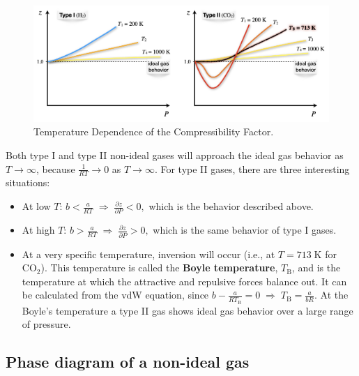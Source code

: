 \documentclass[
  9pt,
]{extbook}
\providecommand{\tightlist}{%
  \setlength{\itemsep}{0pt}\setlength{\parskip}{0pt}}
\theoremstyle{definition}
\theoremstyle{definition}
\theoremstyle{definition}
\theoremstyle{remark}
\begin{document}
\begin{figure}

{\centering \includegraphics[width=0.9\linewidth]{./img/OEP_Figures.013} 

}

\caption{Temperature Dependence of the Compressibility Factor.}\label{fig:Fig1Zb2}
\end{figure}

Both type I and type II non-ideal gases will approach the ideal gas behavior as \(T\rightarrow \infty\), because \(\frac{1}{RT}\rightarrow 0\) as \(T\rightarrow \infty\). For type II gases, there are three interesting situations:

\begin{itemize}
\tightlist
\item
  At low \(T\): \(b<\frac{a}{RT} \; \Rightarrow \; \frac{\partial z}{\partial P} < 0,\) which is the behavior described above.
\item
  At high \(T\): \(b>\frac{a}{RT} \; \Rightarrow \; \frac{\partial z}{\partial P} > 0,\) which is the same behavior of type I gases.
\item
  At a very specific temperature, inversion will occur (i.e., at \(T=713 \; \mathrm{K}\) for \(\mathrm{CO}_2\)). This temperature is called the \textbf{Boyle temperature}, \(T_{\mathrm{B}}\), and is the temperature at which the attractive and repulsive forces balance out. It can be calculated from the vdW equation, since \(b-\frac{a}{RT_{\mathrm{B}}}=0 \; \Rightarrow \; T_{\mathrm{B}}=\frac{a}{bR}.\) At the Boyle's temperature a type II gas shows ideal gas behavior over a large range of pressure.
\end{itemize}

\hypertarget{phase-diagram-of-a-non-ideal-gas}{%
\subsection{Phase diagram of a non-ideal gas}\label{phase-diagram-of-a-non-ideal-gas}}
\end{document}
